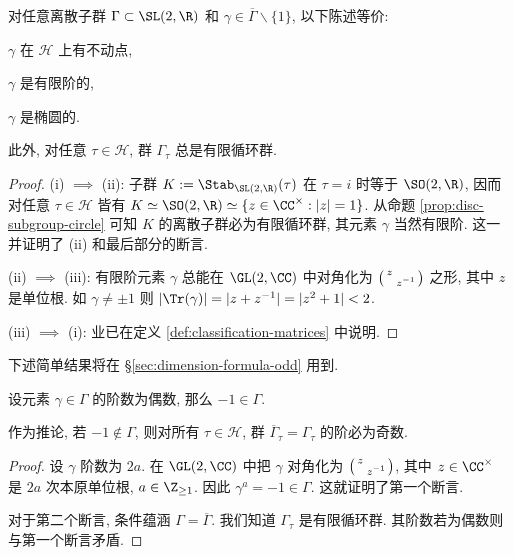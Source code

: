 \begin{proposition}\label{prop:stabilizer-finite-cyclic}
	对任意离散子群 $\Gamma \subset \SL(2,\R)$ 和 $\gamma \in \overline{\Gamma} \smallsetminus \{1\}$, 以下陈述等价:
	\begin{compactenum}[(i)]
		\item $\gamma$ 在 $\mathcal{H}$ 上有不动点,
		\item $\gamma$ 是有限阶的,
		\item $\gamma$ 是椭圆的.
	\end{compactenum}
	此外, 对任意 $\tau \in \mathcal{H}$, 群 $\Gamma_\tau$ 总是有限循环群.
\end{proposition}
\begin{proof}
	(i) $\implies$ (ii): 子群 $K := \Stab_{\SL(2,\R)}(\tau)$ 在 $\tau = i$ 时等于 $\SO(2,\R)$, 因而对任意 $\tau \in \mathcal{H}$ 皆有 $K \simeq \SO(2,\R) \simeq \{z \in \CC^\times: |z|=1 \}$. 从命题 \ref{prop:disc-subgroup-circle} 可知 $K$ 的离散子群必为有限循环群, 其元素 $\gamma$ 当然有限阶. 这一并证明了 (ii) 和最后部分的断言.

	(ii) $\implies$ (iii): 有限阶元素 $\gamma$ 总能在 $\GL(2,\CC)$ 中对角化为 $\bigl(\begin{smallmatrix} z &  \\  & z^{-1} \end{smallmatrix}\bigr)$ 之形, 其中 $z$ 是单位根. 如 $\gamma \neq \pm 1$ 则 $|\Tr(\gamma)| = |z + z^{-1}| = |z^2 + 1| < 2$.
	
	(iii) $\implies$ (i): 业已在定义 \ref{def:classification-matrices} 中说明.
\end{proof}

下述简单结果将在 \S\ref{sec:dimension-formula-odd} 用到.
\begin{proposition}\label{prop:elliptic-odd}
	设元素 $\gamma \in \Gamma$ 的阶数为偶数, 那么 $-1 \in \Gamma$.
	
	作为推论, 若 $-1 \notin \Gamma$, 则对所有 $\tau \in \mathcal{H}$, 群 $\overline{\Gamma}_\tau = \Gamma_\tau$ 的阶必为奇数.
\end{proposition}
\begin{proof}
	设 $\gamma$ 阶数为 $2a$. 在 $\GL(2, \CC)$ 中把 $\gamma$ 对角化为 $\bigl(\begin{smallmatrix} z &  \\  & z^{-1} \end{smallmatrix}\bigr)$, 其中 $z \in \CC^\times$ 是 $2a$ 次本原单位根, $a \in \Z_{\geq 1}$. 因此 $\gamma^a = -1 \in \Gamma$. 这就证明了第一个断言.
	
	对于第二个断言, 条件蕴涵 $\Gamma = \overline{\Gamma}$. 我们知道 $\Gamma_\tau$ 是有限循环群. 其阶数若为偶数则与第一个断言矛盾.
\end{proof}


